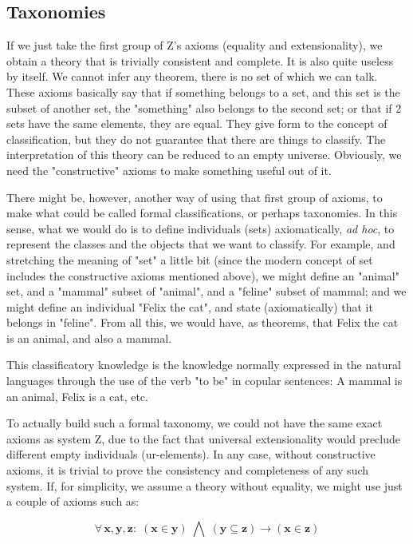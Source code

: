 \documentclass{IOS-Book-Article}     %
\begin{document}
\subsection{Taxonomies}
If we just take the first group of Z's axioms (equality and extensionality),
we obtain a theory that is trivially consistent and complete. It is also
quite useless by itself. We cannot infer any theorem, there is no set of which
we can talk. These axioms basically say that if something belongs to a set,
and this set is the subset of another set, the "something" also belongs to the
second set; or that if 2 sets have the same elements, they are equal.  They
give form to the concept of classification, but they do not guarantee that
there are things to classify.  The interpretation of this theory can be reduced
to an empty universe. Obviously, we need the "constructive" axioms to make
something useful out of it.

There might be, however, another way of using that first group of axioms,
to make what could be called formal classifications, or perhaps taxonomies.
In this sense, what we would do is to define individuals (sets) axiomatically,
\textit{ad hoc}, to represent the classes and the objects that we want to classify.
For example, and stretching the meaning of "set" a little bit (since the
modern concept of set includes the constructive axioms mentioned above),
we might define an "animal" set, and a "mammal" subset of "animal",
and a "feline" subset of mammal; and we might define an individual
"Felix the cat", and state (axiomatically) that it belongs in "feline".
From all this, we would have, as theorems, that Felix the cat is an animal,
and also a mammal.

This classificatory knowledge is the knowledge normally expressed
in the natural languages through the use of the verb "to be" in
copular sentences: A mammal is an animal, Felix is a cat, etc.

To actually build such a formal taxonomy, we could not have the same exact
axioms as system Z, due to the fact that universal extensionality would
preclude different empty individuals (ur-elements). In any case, without
constructive axioms, it is trivial to prove the consistency and completeness
of any such system. If, for simplicity, we assume a theory without equality,
we might use just a couple of axioms such as:

\begin{equation}
\forall\,\mathbf{x\mathrm{,\mathbf{y\mathrm{,\mathbf{z}:\;\left(\mathbf{x\in y}\right)\;\bigwedge\;\left(\mathbf{y\subseteq\mathbf{z}}\right)\rightarrow\left(\mathbf{x\in\mathbf{z}}\right)}}}}
\end{equation}
\end{document}
